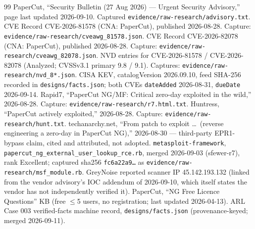 \documentclass[journal]{IEEEtran}
\begin{document}
\begin{thebibliography}{99}
 PaperCut, ``Security Bulletin (27 Aug 2026) — Urgent
Security Advisory,'' page last updated 2026-09-10. Captured
\texttt{evidence/raw-research/advisory.txt}.
 CVE Record CVE-2026-81578 (CNA: PaperCut), published
2026-08-28. Capture: \texttt{evidence/raw-research/cveawg\_81578.json}.
 CVE Record CVE-2026-82078 (CNA: PaperCut), published
2026-08-28. Capture: \texttt{evidence/raw-research/cveawg\_82078.json}.
 NVD entries for CVE-2026-81578 / CVE-2026-82078 (Analyzed;
CVSSv3.1 primary 9.8 / 9.1). Captures:
\texttt{evidence/raw-research/nvd\_8*.json}.
 CISA KEV, catalogVersion 2026.09.10, feed SHA-256 recorded in
\texttt{designs/facts.json}; both CVEs \texttt{dateAdded} 2026-08-31,
\texttt{dueDate} 2026-09-14.
 Rapid7, ``PaperCut NG/MF: Critical zero-day exploited in the
wild,'' 2026-08-28. Capture: \texttt{evidence/raw-research/r7.html.txt}.
 Huntress, ``PaperCut actively exploited,'' 2026-08-28.
Capture: \texttt{evidence/raw-research/hunt.txt}.
 techanarchy.net, ``From patch to exploit \ldots\ (reverse
engineering a zero-day in PaperCut NG),'' 2026-08-30 — third-party EPR1-bypass
claim, cited and attributed, not adopted.
 \texttt{metasploit-framework},
\texttt{papercut\_ng\_\hspace{0pt}external\_\hspace{0pt}user\_\hspace{0pt}lookup\_\hspace{0pt}rce.rb}, merged 2026-09-03
(sfewer-r7), rank Excellent; captured sha256 \texttt{fc6a22a9\ldots} as
\texttt{evidence/raw-research/msf\_module.rb}.
 GreyNoise reported scanner IP 45.142.193.132 (linked from
the vendor advisory's IOC addendum of 2026-09-10, which itself states the
vendor has not independently verified it).
 PaperCut, ``NG Free Licence Questions'' KB (free $\leq$5
users, no registration; last updated 2026-04-13).
 ARL Case 003 verified-facts machine record,
\texttt{designs/facts.json} (provenance-keyed; merged 2026-09-11).
\end{thebibliography}
\end{document}
